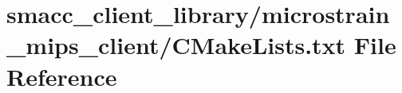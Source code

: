 \hypertarget{client__library_2microstrain__mips__client_2CMakeLists_8txt}{}\section{smacc\+\_\+client\+\_\+library/microstrain\+\_\+mips\+\_\+client/\+C\+Make\+Lists.txt File Reference}
\label{client__library_2microstrain__mips__client_2CMakeLists_8txt}
